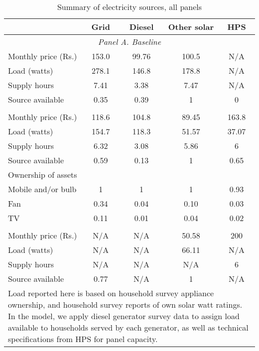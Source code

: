 \begin{table}[htbp]\centering
\caption{Summary of electricity sources, all panels\label{tab:sourcestats}}
\begin{tabular}{l*{4}{c}}
\toprule
                &     Grid&   Diesel & Other solar &      HPS\\
\midrule
\multicolumn{5}{c}{\emph{Panel A. Baseline}} \\
Monthly price (Rs.)&    153.0&    99.76&    100.5&      N/A\\

Load (watts)&    278.1&    146.8&    178.8 &       N/A\\

Supply hours&    7.41&    3.38&    7.47 &        N/A\\

Source available &    0.35&    0.39&        1&        0\\
\addlinespace
\multicolumn{5}{c}{\emph{Panel B. Endline 1}} \\
Monthly price (Rs.)&    118.6&    104.8&    89.45&    163.8\\

Load (watts)&    154.7&      118.3&    51.57&       37.07\\

Supply hours&    6.32&    3.08&    5.86&        6\\

Source available&    0.59&    0.13&        1&    0.65\\
Ownership of assets & & & &\\

\hspace{5mm} Mobile and/or bulb&        1&        1&        1&    0.93\\

\hspace{5mm} Fan             &    0.34&   0.04&   0.10&   0.03\\

\hspace{5mm} TV              &    0.11&   0.01&   0.04&   0.02\\
\addlinespace
\multicolumn{5}{c}{\emph{Panel C. Endline 2}} \\
Monthly price (Rs.)    &  N/A&   N/A &        50.58&      200\\
Load (watts)     &        N/A &      N/A &    66.11&       N/A\\

Supply hours    &       N/A &        N/A &     N/A&        6\\

Source available     &        0.77&        N/A&        1&       N/A\\

\bottomrule
\multicolumn{5}{p{11cm}}{\footnotesize Load reported here is based on household survey appliance ownership, and household survey reports of own solar watt ratings. In the model, we apply diesel generator survey data to assign load available to households served by each generator, as well as technical specifications from HPS for panel capacity.}\\
\end{tabular}
\end{table}
